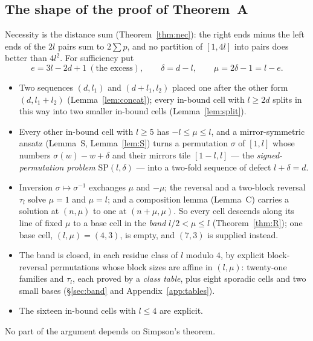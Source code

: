 \documentclass[11pt]{amsart}
\theoremstyle{plain}
\theoremstyle{definition}
\theoremstyle{remark}
\newcommand{\SP}{\mathrm{SP}}
\begin{document}
\subsection*{The shape of the proof of Theorem~A}
Necessity is the distance sum (Theorem~\ref{thm:nec}): the right ends minus the left
ends of the $2l$ pairs sum to $2\sum p$, and no partition of $[1,4l]$ into pairs does
better than $4l^2$. For sufficiency put
\[
  e = 3l-2d+1 \ (\text{the excess}), \qquad
  \delta = d-l, \qquad \mu = 2\delta-1 = l-e .
\]
\begin{itemize}
\item Two sequences $(d,l_1)$ and $(d+l_1,l_2)$ placed one after the other form
  $(d,l_1+l_2)$ (Lemma~\ref{lem:concat}); every in-bound cell with $l \ge 2d$ splits in
  this way into two smaller in-bound cells (Lemma~\ref{lem:split}).
\item Every other in-bound cell with $l \ge 5$ has $-l \le \mu \le l$, and a
  mirror-symmetric ansatz (Lemma~S, Lemma~\ref{lem:S}) turns a permutation $\sigma$ of
  $[1,l]$ whose numbers $\sigma(w)-w+\delta$ and their mirrors tile $[1-l,l]$ --- the
  \emph{signed-permutation problem} $\SP(l,\delta)$ --- into a two-fold sequence of
  defect $l + \delta = d$.
\item Inversion $\sigma \mapsto \sigma^{-1}$ exchanges $\mu$ and $-\mu$; the reversal
  and a two-block reversal $\tau_l$ solve $\mu = 1$ and $\mu = l$; and a composition
  lemma (Lemma~C) carries a solution at $(n,\mu)$ to one at $(n+\mu,\mu)$. So every cell
  descends along its line of fixed $\mu$ to a base cell in the \emph{band}
  $l/2 < \mu \le l$ (Theorem~\ref{thm:R}); one base cell, $(l,\mu) = (4,3)$, is empty, and
  $(7,3)$ is supplied instead.
\item The band is closed, in each residue class of $l$ modulo $4$, by explicit
  block-reversal permutations whose block sizes are affine in $(l,\mu)$: twenty-one
  families and $\tau_l$, each proved by a \emph{class table}, plus eight sporadic cells
  and two small bases (\S\ref{sec:band} and Appendix~\ref{app:tables}).
\item The sixteen in-bound cells with $l \le 4$ are explicit.
\end{itemize}
No part of the argument depends on Simpson's theorem.
\end{document}
